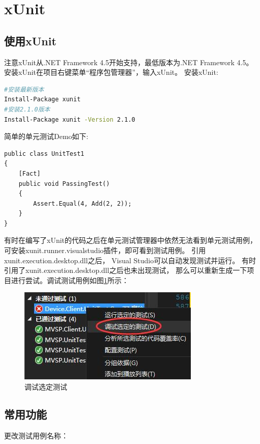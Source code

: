 \documentclass{book}
\begin{document}
\section{xUnit}

\subsection{使用xUnit}

注意xUnit从.NET Framework 4.5开始支持，最低版本为.NET Framework 4.5。
安装xUnit在项目右键菜单“程序包管理器”，输入xUnit。
安装xUnit:

\begin{lstlisting}[language=Bash]
#安装最新版本
Install-Package xunit
#安装2.1.0版本
Install-Package xunit -Version 2.1.0
\end{lstlisting}


简单的单元测试Demo如下:

\begin{lstlisting}[language={[Sharp]C}]
public class UnitTest1
{
	[Fact]
	public void PassingTest()
	{
		Assert.Equal(4, Add(2, 2));
	}
}
\end{lstlisting}

有时在编写了xUnit的代码之后在单元测试管理器中依然无法看到单元测试用例，
可安装xunit.runner.visualstudio插件，即可看到测试用例。
引用xunit.execution.desktop.dll之后，
Visual Studio可以自动发现测试并运行。
有时引用了xunit.execution.desktop.dll之后也未出现测试，
那么可以重新生成一下项目进行尝试。调试测试用例如图\ref{fig:DebugTestCase}所示：

\begin{figure}[htbp]
	\centering
	\includegraphics[scale=0.6]{DebugTestCase.jpg}
	\caption{调试选定测试}
	\label{fig:DebugTestCase}
\end{figure}

\subsection{常用功能}

更改测试用例名称：
\end{document}
